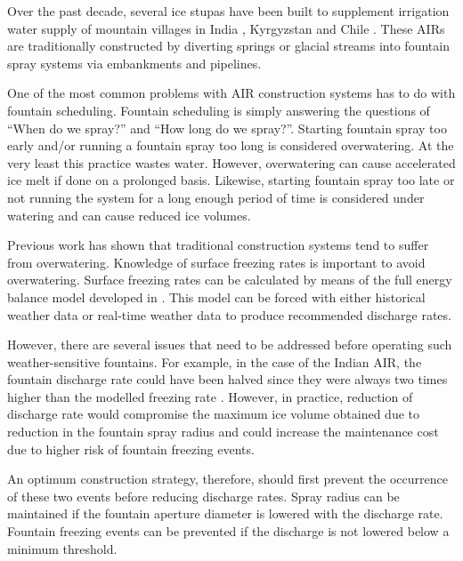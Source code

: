 \documentclass[tc, manuscript]{copernicus}
\begin{document}
Over the past decade, several ice stupas have been built to supplement irrigation water supply of mountain
villages in India \citep{wangchukIceStupaCompetition2020, palmerStoringFrozenWater2022,
aggarwalAdaptationClimateChange2021}, Kyrgyzstan \citep{bbcnewsBrightArtificialGlacier2020} and Chile
\citep{reutersConservationistsChileAim2021}. These AIRs are traditionally constructed by diverting springs or
glacial streams into fountain spray systems via embankments and pipelines. 

One of the most common problems with AIR construction systems has to do with fountain scheduling. Fountain
scheduling is simply answering the questions of “When do we spray?” and “How long do we spray?”. Starting fountain
spray too early and/or running a fountain spray too long is considered overwatering. At the very least this
practice wastes water. However, overwatering can cause accelerated ice melt if done on a prolonged basis.
Likewise, starting fountain spray too late or not running the system for a long enough period of time is
considered under watering and can cause reduced ice volumes.

Previous work \citep{balasubramanianInfluenceMeteorologicalConditions2022} has shown that traditional
construction systems tend to suffer from overwatering. Knowledge of surface freezing rates is important to
avoid overwatering. Surface freezing rates can be calculated by means of the full energy balance model
developed in \cite{balasubramanianInfluenceMeteorologicalConditions2022}. This model can be forced with either
historical weather data or real-time weather data to produce recommended discharge rates.

However, there are several issues that need to be addressed before operating such weather-sensitive fountains.
For example, in the case of the Indian AIR, the fountain discharge rate could have been halved since they were
always two times higher than the modelled freezing rate
\citep{balasubramanianInfluenceMeteorologicalConditions2022}. However, in practice, reduction of discharge rate
would compromise the maximum ice volume obtained due to reduction in the fountain spray radius and could
increase the maintenance cost due to higher risk of fountain freezing events.  

An optimum construction strategy, therefore, should first prevent the occurrence of these two events before
reducing discharge rates. Spray radius can be maintained if the fountain aperture diameter is lowered with the
discharge rate. Fountain freezing events can be prevented if the discharge is not lowered below a minimum
threshold. 
\end{document}
